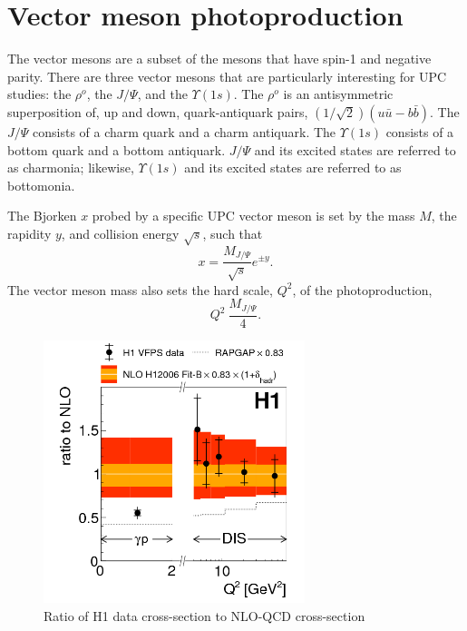 \section{Vector meson photoproduction}
The vector mesons are a subset of the mesons that have spin-1 and negative parity. There are three vector mesons that are particularly interesting for UPC studies: the $\rho^o$, the $J/\Psi$, and the $\Upsilon(1s)$. The $\rho^o$ is an antisymmetric superposition of, up and down, quark-antiquark pairs, $(1/\sqrt{2})(u\bar{u}-b\bar{b})$. The $J/\Psi$ consists of a charm quark and a charm antiquark. The $\Upsilon(1s)$ consists of a bottom quark and a bottom antiquark. $J/\Psi$ and its excited states are referred to as charmonia; likewise, $\Upsilon(1s)$ and its excited states are referred to as bottomonia.

The Bjorken $x$ probed by a specific UPC vector meson is set by the mass $M$, the rapidity $y$, and collision energy $\sqrt{s}$, such that
\begin{equation}
x = \frac{M_{J/\Psi}}{\sqrt{s}}e^{\pm y}.
\end{equation} The vector meson mass also sets the hard scale, $Q^2$, of the photoproduction,
\begin{equation}
Q^2 ~ \frac{M_{J/\Psi}}{4}.
\end{equation}

\begin{figure}[]
\begin{centering}
\includegraphics[width=3in]{Chapter1/importfigs/fig8_h1_2015.png}
\par\end{centering}
\caption{Ratio of H1 data cross-section to NLO-QCD cross-section \cite{Andreev:2015cwa} \label{fig:h1Ratio}}
\end{figure}

